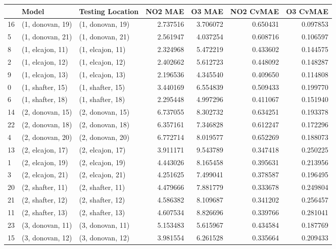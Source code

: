 \begin{tabular}{lllrrrr}
\toprule
{} &             Model &  Testing Location &   NO2 MAE &    O3 MAE &  NO2 CvMAE &  O3 CvMAE \\
\midrule
16 &  (1, donovan, 19) &  (1, donovan, 19) &  2.737516 &  3.706072 &   0.650431 &  0.097853 \\
5  &  (1, donovan, 21) &  (1, donovan, 21) &  2.561947 &  4.037254 &   0.608716 &  0.106597 \\
8  &  (1, elcajon, 11) &  (1, elcajon, 11) &  2.324968 &  5.472219 &   0.433602 &  0.144575 \\
2  &  (1, elcajon, 12) &  (1, elcajon, 12) &  2.402662 &  5.612723 &   0.448092 &  0.148287 \\
9  &  (1, elcajon, 13) &  (1, elcajon, 13) &  2.196536 &  4.345540 &   0.409650 &  0.114808 \\
0  &  (1, shafter, 15) &  (1, shafter, 15) &  3.440169 &  6.554839 &   0.509433 &  0.199770 \\
6  &  (1, shafter, 18) &  (1, shafter, 18) &  2.295448 &  4.997296 &   0.411067 &  0.151940 \\
14 &  (2, donovan, 15) &  (2, donovan, 15) &  6.737055 &  8.302732 &   0.634251 &  0.193378 \\
22 &  (2, donovan, 18) &  (2, donovan, 18) &  6.357161 &  7.346828 &   0.612247 &  0.172296 \\
4  &  (2, donovan, 20) &  (2, donovan, 20) &  6.772714 &  8.019577 &   0.652269 &  0.188073 \\
13 &  (2, elcajon, 17) &  (2, elcajon, 17) &  3.911171 &  9.543789 &   0.347418 &  0.250225 \\
1  &  (2, elcajon, 19) &  (2, elcajon, 19) &  4.443026 &  8.165458 &   0.395631 &  0.213956 \\
3  &  (2, elcajon, 21) &  (2, elcajon, 21) &  4.251625 &  7.499041 &   0.378587 &  0.196495 \\
20 &  (2, shafter, 11) &  (2, shafter, 11) &  4.479666 &  7.881779 &   0.333678 &  0.249804 \\
21 &  (2, shafter, 12) &  (2, shafter, 12) &  4.586382 &  8.109687 &   0.341202 &  0.256457 \\
11 &  (2, shafter, 13) &  (2, shafter, 13) &  4.607534 &  8.826696 &   0.339766 &  0.281041 \\
23 &  (3, donovan, 11) &  (3, donovan, 11) &  5.153483 &  5.615967 &   0.434584 &  0.187769 \\
15 &  (3, donovan, 12) &  (3, donovan, 12) &  3.981554 &  6.261528 &   0.335664 &  0.209433 \\

\end{tabular}
